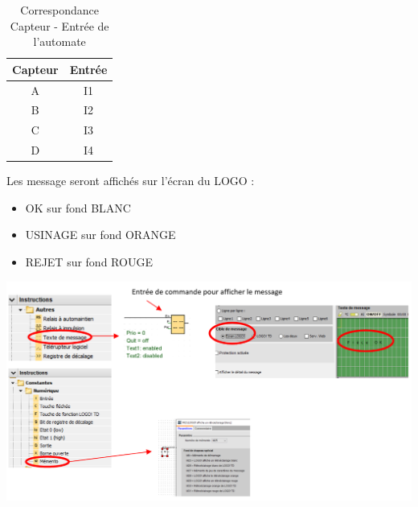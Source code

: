 \begin{table}[ht]
    \centering
    \begin{tabular}[]{c|c}
        Capteur & Entrée \\\hline
        A       &  I1\\
        B       &  I2\\
        C       &  I3\\
        D       &  I4\\
    \end{tabular}
    \caption{Correspondance Capteur - Entrée de l'automate}
\end{table}


\begin{UPSTIactivite}


    Les message seront affichés sur l'écran du LOGO : 
    \begin{itemize}
        \item OK sur fond BLANC
        \item USINAGE sur fond ORANGE
        \item REJET sur fond ROUGE 
    \end{itemize}
    \centering
    \includegraphics[width=.8\textwidth]{images/TP01_couleur_ecran.png}





\end{UPSTIactivite}